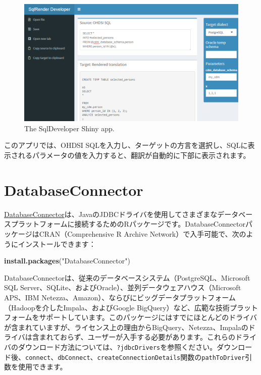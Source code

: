 \documentclass[
  11pt]{book}
\newenvironment{Shaded}{\begin{snugshade}}{\end{snugshade}}
\newcommand{\FunctionTok}[1]{\textcolor[rgb]{0.13,0.29,0.53}{\textbf{#1}}}
\newcommand{\NormalTok}[1]{#1}
\newcommand{\StringTok}[1]{\textcolor[rgb]{0.31,0.60,0.02}{#1}}
\theoremstyle{definition}
\theoremstyle{definition}
\theoremstyle{definition}
\theoremstyle{definition}
\theoremstyle{remark}
\begin{document}
\begin{figure}

{\centering \includegraphics[width=1\linewidth]{images/SqlAndR/sqlDeveloper} 

}

\caption{The SqlDeveloper Shiny app.}\label{fig:sqlDeveloper}
\end{figure}

このアプリでは、OHDSI SQLを入力し、ターゲットの方言を選択し、SQLに表示されるパラメータの値を入力すると、翻訳が自動的に下部に表示されます。

\section{DatabaseConnector}\label{DatabaseConnector}

\href{https://ohdsi.github.io/DatabaseConnector/}{DatabaseConnector}は、JavaのJDBCドライバを使用してさまざまなデータベースプラットフォームに接続するためのRパッケージです。DatabaseConnectorパッケージはCRAN（Comprehensive R Archive Network）で入手可能で、次のようにインストールできます：

\begin{Shaded}
\begin{Highlighting}[]
\FunctionTok{install.packages}\NormalTok{(}\StringTok{"DatabaseConnector"}\NormalTok{)}
\end{Highlighting}
\end{Shaded}

DatabaseConnectorは、従来のデータベースシステム（PostgreSQL、Microsoft SQL Server、SQLite、およびOracle）、並列データウェアハウス（Microsoft APS、IBM Netezza、Amazon）、ならびにビッグデータプラットフォーム（Hadoopを介したImpala、およびGoogle BigQuery）など、広範な技術プラットフォームをサポートしています。このパッケージにはすでにほとんどのドライバが含まれていますが、ライセンス上の理由からBigQuery、Netezza、Impalaのドライバは含まれておらず、ユーザーが入手する必要があります。これらのドライバのダウンロード方法については、\texttt{?jdbcDrivers}を参照ください。ダウンロード後、\texttt{connect}、\texttt{dbConnect}、\texttt{createConnectionDetails}関数の\texttt{pathToDriver}引数を使用できます。
\end{document}
